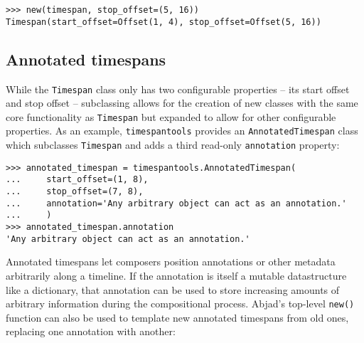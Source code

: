 \begin{singlespacing}
\vspace{-0.5\baselineskip}
\begin{lstlisting}
>>> new(timespan, stop_offset=(5, 16))
Timespan(start_offset=Offset(1, 4), stop_offset=Offset(5, 16))
\end{lstlisting}
\end{singlespacing}

\subsection{Annotated timespans} %

While the \texttt{Timespan} class only has two configurable properties -- its
start offset and stop offset -- subclassing allows for the creation of new
classes with the same core functionality as \texttt{Timespan} but expanded to
allow for other configurable properties. As an example, \texttt{timespantools}
provides an \texttt{AnnotatedTimespan} class which subclasses \texttt{Timespan}
and adds a third read-only \texttt{annotation} property:

\begin{comment}
<abjad>
annotated_timespan = timespantools.AnnotatedTimespan(
    start_offset=(1, 8),
    stop_offset=(7, 8),
    annotation='Any arbitrary object can act as an annotation.'
    )
annotated_timespan.annotation
</abjad>
\end{comment}

\begin{singlespacing}
\vspace{-0.5\baselineskip}
\begin{lstlisting}
>>> annotated_timespan = timespantools.AnnotatedTimespan(
...     start_offset=(1, 8),
...     stop_offset=(7, 8),
...     annotation='Any arbitrary object can act as an annotation.'
...     )
>>> annotated_timespan.annotation
'Any arbitrary object can act as an annotation.'
\end{lstlisting}
\end{singlespacing}

\noindent Annotated timespans let composers position annotations or other
metadata arbitrarily along a timeline. If the annotation is itself a mutable
datastructure like a dictionary, that annotation can be used to store
increasing amounts of arbitrary information during the compositional process.
Abjad's top-level \texttt{new()} function can also be used to template new
annotated timespans from old ones, replacing one annotation with another:


